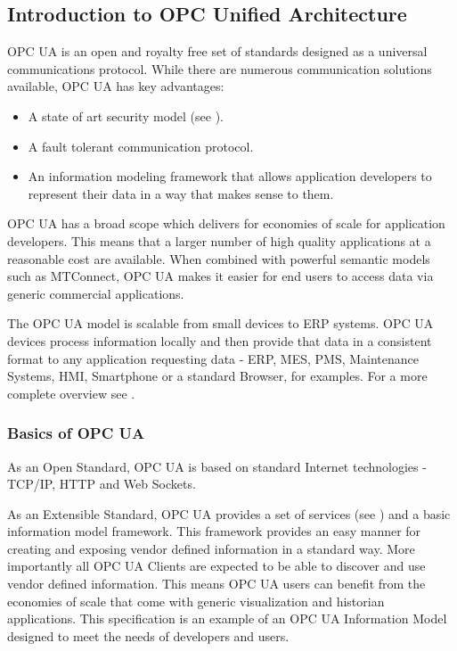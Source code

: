 \subsection{Introduction to OPC Unified Architecture}\label{intro-to-opc-ua}

OPC UA is an open and royalty free set of standards designed as a universal communications protocol.
While there are numerous communication solutions available, OPC UA has key advantages:

\begin{itemize}
\item A state of art security model (see \cite{UAPart2}).
\item A fault tolerant communication protocol.
\item An information modeling framework that allows application developers to represent their data in a way that makes sense to them.
\end{itemize}

OPC UA has a broad scope which delivers for economies of scale for application developers. This means that a larger number of high quality applications at a reasonable cost are available. When combined with powerful semantic models such as MTConnect, OPC UA makes it easier for end users to access data via generic commercial applications.

The OPC UA model is scalable from small devices to ERP systems. OPC UA devices process information locally and then provide that data in a consistent format to any application requesting data - ERP, MES, PMS, Maintenance Systems, HMI, Smartphone or a standard Browser, for examples. For a more complete overview see \cite{UAPart1}.

\subsubsection{Basics of OPC UA}

As an Open Standard, OPC UA is based on standard Internet technologies - TCP/IP, HTTP and Web Sockets.

As an Extensible Standard, OPC UA provides a set of services (see \cite{UAPart4}) and a basic information model framework. This framework provides an easy manner for creating and exposing vendor defined information in a standard way. More importantly all OPC UA Clients are expected to be able to discover and use vendor defined information. This means OPC UA users can benefit from the economies of scale that come with generic visualization and historian applications. This specification is an example of an OPC UA Information Model designed to meet the needs of developers and users.


